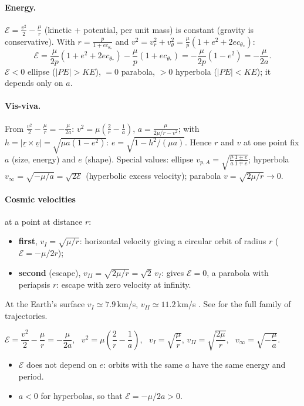 \paragraph{Energy.} $\mathcal E=\frac{v^2}{2}-\frac{\mu}{r}$ (kinetic + potential, per unit mass) is constant (gravity is conservative). With
$r=\frac{p}{1+ec_{\theta_*}}$ and $v^2=v_r^2+v_\theta^2=\frac{\mu}{p}(1+e^2+2ec_{\theta_*})$:
\begin{equation}
\mathcal E=\frac{\mu}{2p}\left(1+e^2+2ec_{\theta_*}\right)-\frac{\mu}{p}\left(1+ec_{\theta_*}\right)=-\frac{\mu}{2p}\left(1-e^2\right)=-\frac{\mu}{2a}.
\end{equation}
$\mathcal E<0$ ellipse ($|PE|>KE$), $=0$ parabola, $>0$ hyperbola ($|PE|<KE$); it depends only on $a$.

\paragraph{Vis-viva.} From $\frac{v^2}{2}-\frac{\mu}{r}=-\frac{\mu}{2a}$: $v^2=\mu\left(\frac2r-\frac1a\right)$, $a=\frac{\mu}{2\mu/r-v^2}$; with
$h=|\underline r\times\underline v|=\sqrt{\mu a(1-e^2)}$: $e=\sqrt{1-h^2/(\mu a)}$. Hence $r$ and $v$ at one point fix $a$ (size, energy) and $e$ (shape).
Special values: ellipse $v_{p,A}=\sqrt{\frac{\mu}{a}\frac{1\pm e}{1\mp e}}$; hyperbola $v_\infty=\sqrt{-\mu/a}=\sqrt{2\mathcal E}$ (hyperbolic excess
velocity); parabola $v=\sqrt{2\mu/r}\to0$.

\paragraph{Cosmic velocities} at a point at distance $r$:
\begin{itemize}
\item \textbf{first}, $v_I=\sqrt{\mu/r}$: horizontal velocity giving a circular orbit of radius $r$ ($\mathcal E=-\mu/2r$);
\item \textbf{second} (escape), $v_{II}=\sqrt{2\mu/r}=\sqrt2\,v_I$: gives $\mathcal E=0$, a parabola with periapsis $r$: escape with zero velocity at infinity.
\end{itemize}
At the Earth's surface $v_I\simeq7.9$\,km/s, $v_{II}\simeq11.2$\,km/s \notinnotes. See  for the full family of trajectories.
\begin{keyf}
$\mathcal E=\dfrac{v^2}{2}-\dfrac{\mu}{r}=-\dfrac{\mu}{2a}$, \ $v^2=\mu\left(\dfrac2r-\dfrac1a\right)$, \ $v_I=\sqrt{\dfrac{\mu}{r}}$, $v_{II}=\sqrt{\dfrac{2\mu}{r}}$, \ $v_\infty=\sqrt{-\dfrac{\mu}{a}}$.
\end{keyf}
\pitfalls
\begin{itemize}
\item $\mathcal E$ does not depend on $e$: orbits with the same $a$ have the same energy and period.
\item $a<0$ for hyperbolas, so that $\mathcal E=-\mu/2a>0$.
\end{itemize}

